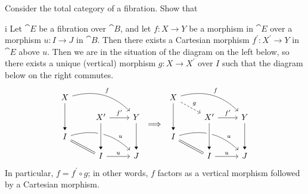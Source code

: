 \begin{exercise}
Consider the total category of a fibration.
Show that
\end{exercise}

\begin{partsolution}{i}
Let \(\cat{E}\) be a fibration over \(\cat{B}\), and let \(f : X \to Y\) be a morphism in \(\cat{E}\) over a morphism \(u : I \to J\) in \(\cat{B}\).
Then there exists a Cartesian morphism \(f^\prime : X^\prime \to Y\) in \(\cat{E}\) above \(u\).
Then we are in the situation of the diagram on the left below, so there exists a unique (vertical) morphism \(g : X \to X^\prime\) over \(I\) such that the diagram below on the right commutes.
\begin{equation*}
\begin{tikzcd}[row sep=small]
X \arrow[rrd, bend left, "f"] \arrow[dd, -Triangle] \\
& X^\prime \arrow[r, "f^\prime"] & Y \arrow[dd, -Triangle] \\
I \arrow[rd, equal] \arrow[rrd, bend left, near end, "u"] \\
& I \arrow[r, "u"] & J
\arrow[from=uul, to=l, -Triangle, crossing over]
\end{tikzcd}
\implies
\begin{tikzcd}[row sep=small]
X \arrow[rrd, bend left, "f"] \arrow[dd, -Triangle] \arrow[rd, dashed, "g"] \\
& X^\prime \arrow[r, "f^\prime"] & Y \arrow[dd, -Triangle] \\
I \arrow[rd, equal] \arrow[rrd, bend left, near end, "u"] \\
& I \arrow[r, "u"] & J
\arrow[from=uul, to=l, -Triangle, crossing over]
\end{tikzcd}
\end{equation*}
In particular, \(f = f^\prime \circ g\); in other words, \(f\) factors as a vertical morphism followed by a Cartesian morphism.
\end{partsolution}